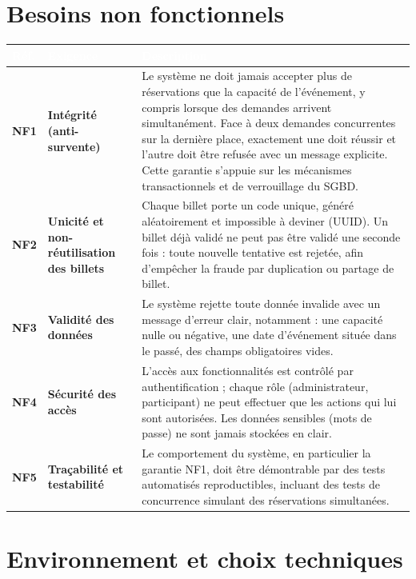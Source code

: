 \documentclass[12pt,a4paper]{report}
\begin{document}
\section{Besoins non fonctionnels}

\begin{center}\small
\begin{longtable}{|p{5.00cm}|p{5.00cm}|p{5.00cm}|}
\hline
\rowcolor{entetetable}
\textbf{\textcolor{white}{Réf.}} & \textbf{\textcolor{white}{Exigence}} & \textbf{\textcolor{white}{Description}} \\ \hline
\textbf{NF1} & \textbf{Intégrité (anti-survente)} & Le système ne doit jamais accepter plus de réservations que la capacité de l'événement, y compris lorsque des demandes arrivent simultanément. Face à deux demandes concurrentes sur la dernière place, exactement une doit réussir et l'autre doit être refusée avec un message explicite. Cette garantie s'appuie sur les mécanismes transactionnels et de verrouillage du SGBD. \\ \hline
\textbf{NF2} & \textbf{Unicité et non-réutilisation des billets} & Chaque billet porte un code unique, généré aléatoirement et impossible à deviner (UUID). Un billet déjà validé ne peut pas être validé une seconde fois : toute nouvelle tentative est rejetée, afin d'empêcher la fraude par duplication ou partage de billet. \\ \hline
\textbf{NF3} & \textbf{Validité des données} & Le système rejette toute donnée invalide avec un message d'erreur clair, notamment : une capacité nulle ou négative, une date d'événement située dans le passé, des champs obligatoires vides. \\ \hline
\textbf{NF4} & \textbf{Sécurité des accès} & L'accès aux fonctionnalités est contrôlé par authentification ; chaque rôle (administrateur, participant) ne peut effectuer que les actions qui lui sont autorisées. Les données sensibles (mots de passe) ne sont jamais stockées en clair. \\ \hline
\textbf{NF5} & \textbf{Traçabilité et testabilité} & Le comportement du système, en particulier la garantie NF1, doit être démontrable par des tests automatisés reproductibles, incluant des tests de concurrence simulant des réservations simultanées. \\ \hline
\end{longtable}\end{center}

\section{Environnement et choix techniques}
\end{document}
